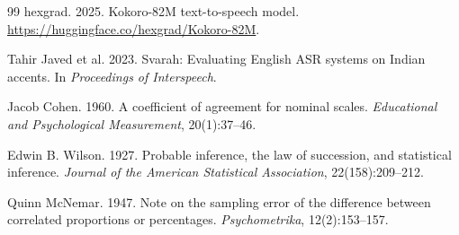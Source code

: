 \documentclass[11pt,a4paper]{article}
\begin{document}
\begin{thebibliography}{99}
 hexgrad. 2025. Kokoro-82M text-to-speech model. \url{https://huggingface.co/hexgrad/Kokoro-82M}.

 Tahir Javed et al. 2023. Svarah: Evaluating English ASR systems on Indian accents. In
\emph{Proceedings of Interspeech}.

 Jacob Cohen. 1960. A coefficient of agreement for nominal scales. \emph{Educational and Psychological
Measurement}, 20(1):37--46.

 Edwin B. Wilson. 1927. Probable inference, the law of succession, and statistical inference.
\emph{Journal of the American Statistical Association}, 22(158):209--212.

 Quinn McNemar. 1947. Note on the sampling error of the difference between correlated proportions or
percentages. \emph{Psychometrika}, 12(2):153--157.

\end{thebibliography}
\end{document}

